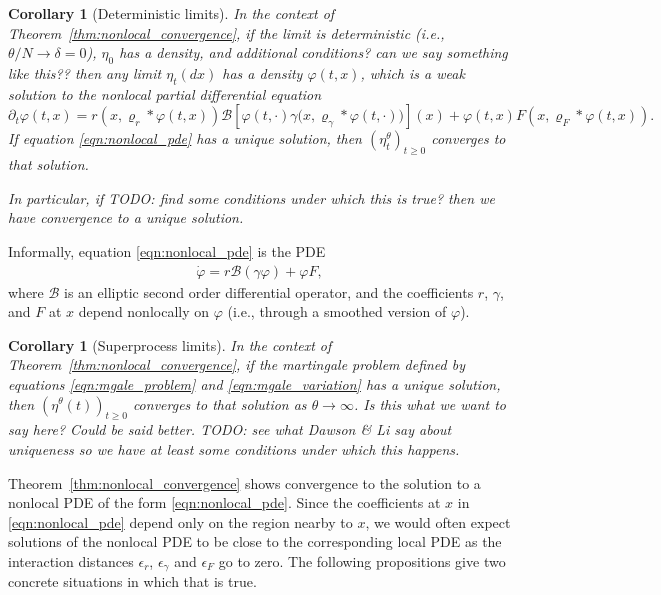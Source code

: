 \documentclass[12pt]{article}
\newtheorem{corollary}[theorem]{Corollary}
\newcommand{\DG}{\mathcal{B}}  %
\newcommand{\kernel}{\varrho}  %
\newcommand{\smooth}[1]{\kernel_{#1} \! * \!}  %
\newcommand{\comment}[1]{{\color{blue} \it #1}}
\begin{document}
\begin{corollary}[Deterministic limits]
    \label{cor:nonlocal_pde_limits}
    In the context of Theorem~\ref{thm:nonlocal_convergence},
    if the limit is deterministic (i.e., $\theta / N \to \delta = 0$), $\eta_0$ has a density,
    and \comment{additional conditions? can we say something like this??}
    then any limit $\eta_t(dx)$ has a density $\varphi(t, x)$,
    which is a weak solution to the nonlocal partial differential equation
    \begin{equation} \label{eqn:nonlocal_pde}
        \partial_t \varphi(t, x)
        =
        r\left(x, \smooth{r} \varphi(t,x) \right)
        \mathcal{B} \left[
            \varphi(t, \cdot)
            \gamma\big( x, \smooth{\gamma} \varphi(t, \cdot) \big)
        \right](x)
        +
        \varphi(t, x)
        F\left(x, \smooth{F} \varphi(t,x) \right)
        .
    \end{equation}
    If equation \eqref{eqn:nonlocal_pde} has a unique solution,
    then $(\eta^\theta_t)_{t \ge 0}$ converges to that solution.

    In particular, if
    \comment{TODO: find some conditions under which this is true?}
    then we have convergence to a unique solution.
\end{corollary}

Informally, equation \eqref{eqn:nonlocal_pde} is the PDE
\begin{align} \label{eqn:pde}
    \dot \varphi = r \DG\left( \gamma \varphi \right) + \varphi F ,
\end{align}
where $\DG$ is an elliptic second order differential operator,
and the coefficients $r$, $\gamma$, and $F$
at $x$ depend nonlocally on $\varphi$
(i.e., through a smoothed version of $\varphi$).

\begin{corollary}[Superprocess limits] \label{cor:superprocess_uniqueness}
    In the context of Theorem~\ref{thm:nonlocal_convergence},
    if the martingale problem
    defined by equations \eqref{eqn:mgale_problem} and \eqref{eqn:mgale_variation}
    has a unique solution,
    then $(\eta^\theta(t))_{t \ge 0}$ converges to that solution
    as $\theta \to \infty$.
    \comment{
        Is this what we want to say here? Could be said better.
        TODO: see what Dawson \& Li say about uniqueness
        so we have at least some conditions under which this happens.
    }
\end{corollary}

Theorem~\ref{thm:nonlocal_convergence} shows convergence to the solution to a nonlocal PDE
of the form \eqref{eqn:nonlocal_pde}.
Since the coefficients at $x$ in \eqref{eqn:nonlocal_pde}
depend only on the region nearby to $x$,
we would often expect solutions of the nonlocal PDE to be close to the corresponding local PDE
as the interaction distances $\epsilon_r$, $\epsilon_\gamma$ and $\epsilon_F$
go to zero.
The following propositions give two concrete situations in which that is true.
\end{document}
